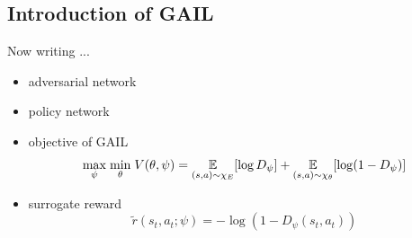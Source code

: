 \subsection{Introduction of GAIL}

Now writing ...

\begin{itemize}
\item adversarial network
\item policy network
\item objective of GAIL
\[
\underset{\psi}{\max}\hspace{1mm}
\underset{\theta}{\min}\hspace{1mm}
V(\theta, \psi) = 
\underset{(s,a) \sim \chi_E}{\mathbb{E}}[\log D_{\psi}] + 
\underset{(s,a) \sim \chi_{\theta}}{\mathbb{E}}[\log(1 - D_{\psi})]
\]
\item surrogate reward
\[
\tilde{r}(s_t,a_t;\psi)=-\log (1-D_{\psi}(s_t,a_t))
\]


\end{itemize}


